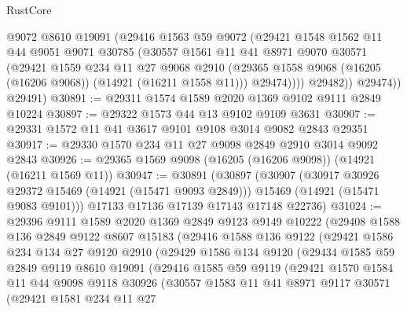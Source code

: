 \begin{lexlean}{RustCore}
\begin{coremodule}
              @9072
              @8610
              @19091
              (@29416
                @1563
                @59
                @9072
                (@29421
                  @1548
                  @1562
                  @11
                  @44
                  @9051
                  @9071
                  @30785
                  (@30557
                    @1561
                    @11
                    @41
                    @8971
                    @9070
                    @30571
                    (@29421
                      @1559
                      @234
                      @11
                      @27
                      @9068
                      @2910
                      (@29365 @1558 @9068 (@16205 (@16206 @9068)) (@14921 (@16211 @1558 @11)))
                      @29474))))
              @29482))
          @29474))
      @29491)
@30891 := @29311 @1574 @1589 @2020 @1369 @9102 @9111 @2849 @10224
@30897 := @29322 @1573 @44 @13 @9102 @9109 @3631
@30907 := @29331 @1572 @11 @41 @3617 @9101 @9108 @3014 @9082 @2843 @29351
@30917 := @29330 @1570 @234 @11 @27 @9098 @2849 @2910 @3014 @9092 @2843
@30926 := @29365 @1569 @9098 (@16205 (@16206 @9098)) (@14921 (@16211 @1569 @11))
@30947 := @30891
    (@30897
      (@30907
        (@30917 @30926 @29372 @15469 (@14921 (@15471 @9093 @2849)))
        @15469
        (@14921 (@15471 @9083 @9101)))
      @17133
      @17136
      @17139
      @17143
      @17148
      @22736)
@31024 := @29396
    @9111
    @1589
    @2020
    @1369
    @2849
    @9123
    @9149
    @10222
    (@29408
      @1588
      @136
      @2849
      @9122
      @8607
      @15183
      (@29416
        @1588
        @136
        @9122
        (@29421
          @1586
          @234
          @134
          @27
          @9120
          @2910
          (@29429
            @1586
            @134
            @9120
            (@29434
              @1585
              @59
              @2849
              @9119
              @8610
              @19091
              (@29416
                @1585
                @59
                @9119
                (@29421
                  @1570
                  @1584
                  @11
                  @44
                  @9098
                  @9118
                  @30926
                  (@30557
                    @1583
                    @11
                    @41
                    @8971
                    @9117
                    @30571
                    (@29421
                      @1581
                      @234
                      @11
                      @27

\end{coremodule}
\end{lexlean}
